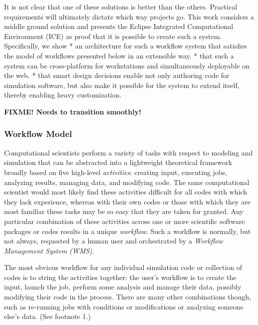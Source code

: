 It is not clear that one of these solutions is better than the others.
Practical requirements will ultimately dictate which way projects go.
This work considers a middle ground solution and presents the Eclipse
Integrated Computational Environment (ICE) as proof that it is possible
to create such a system. Specifically, we show * an architecture for
such a workflow system that satisfies the model of workflows presented
below in an extensible way. * that such a system can be cross-platform
for workstations and simultaneously deployable on the web. * that smart
design decisions enable not only authoring code for simulation software,
but also make it possible for the system to extend itself, thereby
enabling heavy customization.

\textbf{FIXME! Needs to transition smoothly!}

\subsubsection{Workflow Model}\label{workflow-model}

Computational scientists perform a variety of tasks with respect to
modeling and simulation that can be abstracted into a lightweight
theoretical framework broadly based on five high-level
\emph{activities}: creating input, executing jobs, analyzing results,
managing data, and modifying code. The same computational scientist
would most likely find these activities difficult for all codes with
which they lack experience, whereas with their own codes or those with
which they are most familiar these tasks may be so easy that they are
taken for granted. Any particular combination of these activities across
one or more scientific software packages or codes results in a unique
\emph{workflow}. Such a workflow is normally, but not always, requested
by a human user and orchestrated by a \emph{Workflow Management System
(WMS)}.

The most obvious workflow for any individual simulation code or
collection of codes is to string the activities together: the user's
workflow is to create the input, launch the job, perform some analysis
and manage their data, possibly modifying their code in the process.
There are many other combinations though, such as re-running jobs with
conditions or modifications or analyzing someone else's data. (See
footnote 1.)

